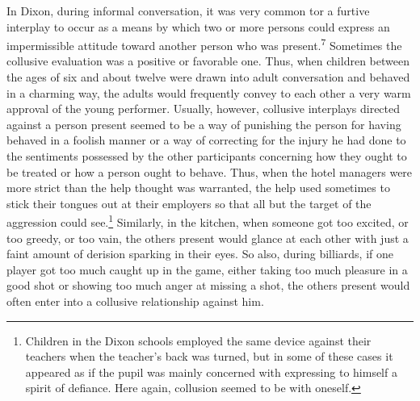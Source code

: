 \documentclass[twoside,symmetric,nobib,justified]{tufte-book}
\begin{document}
\noindent In Dixon, during informal conversation, it was very common tor a furtive
interplay to occur as a means by which two or more persons could express
an impermissible attitude toward another person who was
present.\textsuperscript{7} Sometimes the collusive evaluation was a
positive or favorable one. Thus, when children between the ages of six
and about twelve were drawn into adult conversation and behaved in a
charming way, the adults would frequently convey to each other a very
warm approval of the young performer. Usually, however, collusive
interplays directed against a person present seemed to be a way of
punishing the person for having behaved in a foolish manner or a way of
correcting for the injury he had done to the sentiments possessed by the
other participants concerning how they ought to be treated or how a
person ought to behave. Thus, when the hotel managers were more strict
than the help thought was warranted, the help used sometimes to stick
their tongues out at their employers so that all but the target of the
aggression could see.\footnote{Children in the Dixon schools employed
  the same device against their teachers when the teacher's back was
  turned, but in some of these cases it appeared as if the pupil was
  mainly concerned with expressing to himself a spirit of defiance. Here
  again, collusion seemed to be with oneself.} Similarly, in the
kitchen, when someone got too excited, or too greedy, or too vain, the
others present would glance at each other with just a faint amount of
derision sparking in their eyes. So also, during billiards, if one
player got too much caught up in the game, either taking too much
pleasure in a good shot or showing too much anger at missing a shot, the
others present would often enter into a collusive relationship against
him.
\end{document}
